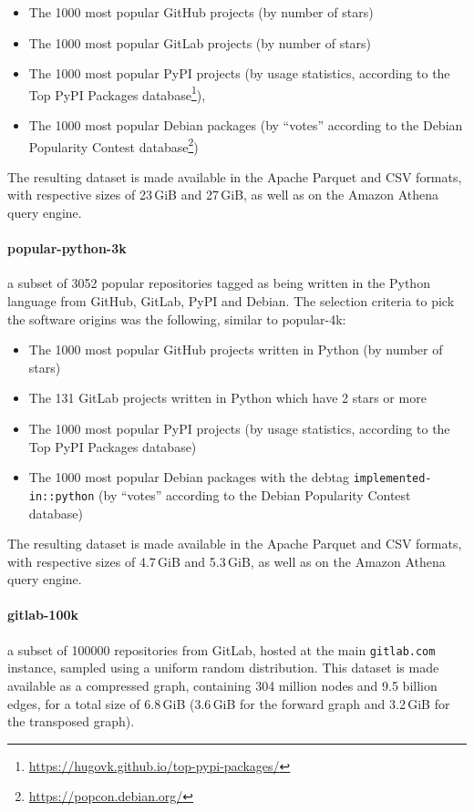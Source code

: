 \begin{itemize}
    \setlength\itemsep{0em}
    \item The 1000 most popular GitHub projects (by number of stars)
    \item The 1000 most popular GitLab projects (by number of stars)
    \item The 1000 most popular PyPI projects (by usage statistics, according
        to the Top PyPI Packages
        database\footnote{\url{https://hugovk.github.io/top-pypi-packages/}}),
    \item The 1000 most popular Debian packages (by “votes” according to the
        Debian Popularity Contest
        database\footnote{\url{https://popcon.debian.org/}})
\end{itemize}

The resulting dataset is made available in the Apache Parquet and CSV formats,
with respective sizes of 23\,GiB and 27\,GiB, as well as on the Amazon Athena
query engine.

\paragraph{popular-python-3k} a subset of 3052 popular repositories tagged as
being written in the Python language from GitHub, GitLab, PyPI and Debian. The
selection criteria to pick the software origins was the following, similar to
popular-4k:

\begin{itemize}
    \setlength\itemsep{0em}
    \item The 1000 most popular GitHub projects written in Python (by number of
        stars)
    \item The 131 GitLab projects written in Python which have 2 stars or more
    \item The 1000 most popular PyPI projects (by usage statistics, according
        to the Top PyPI Packages database)
    \item The 1000 most popular Debian packages with the debtag
        \texttt{implemented-in::python} (by “votes” according to the Debian
        Popularity Contest database)
\end{itemize}

The resulting dataset is made available in the Apache Parquet and CSV formats,
with respective sizes of 4.7\,GiB and 5.3\,GiB, as well as on the Amazon Athena
query engine.

\paragraph{gitlab-100k} a subset of \num{100000} repositories from GitLab,
hosted at the main \texttt{gitlab.com} instance, sampled using a uniform random
distribution. This dataset is made available as a compressed graph, containing
304 million nodes and 9.5 billion edges, for a total size of 6.8\,GiB (3.6\,GiB
for the forward graph and 3.2\,GiB for the transposed graph).

